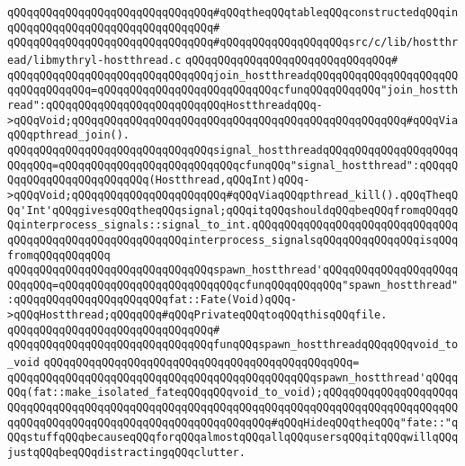 \verb|qQQqqQQqqQQqqQQqqQQqqQQqqQQqqQQq#qQQqtheqQQqtableqQQqconstructedqQQqin|\newline
\verb|qQQqqQQqqQQqqQQqqQQqqQQqqQQqqQQq#|\newline
\verb|qQQqqQQqqQQqqQQqqQQqqQQqqQQqqQQq#qQQqqQQqqQQqqQQqqQQqsrc/c/lib/hostthread/libmythryl-hostthread.c|\newline
\verb|qQQqqQQqqQQqqQQqqQQqqQQqqQQqqQQq#|\newline
\verb|qQQqqQQqqQQqqQQqqQQqqQQqqQQqqQQqjoin_hostthreadqQQqqQQqqQQqqQQqqQQqqQQqqQQqqQQqqQQq=qQQqqQQqqQQqqQQqqQQqqQQqqQQqcfunqQQqqQQqqQQq"join_hostthread":qQQqqQQqqQQqqQQqqQQqqQQqqQQqHostthreadqQQq->qQQqVoid;qQQqqQQqqQQqqQQqqQQqqQQqqQQqqQQqqQQqqQQqqQQqqQQqqQQq#qQQqViaqQQqpthread_join().|\newline
\verb|qQQqqQQqqQQqqQQqqQQqqQQqqQQqqQQqsignal_hostthreadqQQqqQQqqQQqqQQqqQQqqQQqqQQq=qQQqqQQqqQQqqQQqqQQqqQQqqQQqcfunqQQq"signal_hostthread":qQQqqQQqqQQqqQQqqQQqqQQqqQQq(Hostthread,qQQqInt)qQQq->qQQqVoid;qQQqqQQqqQQqqQQqqQQqqQQq#qQQqViaqQQqpthread_kill().qQQqTheqQQq'Int'qQQqgivesqQQqtheqQQqsignal;qQQqitqQQqshouldqQQqbeqQQqfromqQQqqQQqinterprocess_signals::signal_to_int.qQQqqQQqqQQqqQQqqQQqqQQqqQQqqQQqqQQqqQQqqQQqqQQqqQQqqQQqqQQqinterprocess_signalsqQQqqQQqqQQqqQQqisqQQqfromqQQqqQQqqQQq|\newline
\verb|qQQqqQQqqQQqqQQqqQQqqQQqqQQqqQQqspawn_hostthread'qQQqqQQqqQQqqQQqqQQqqQQqqQQq=qQQqqQQqqQQqqQQqqQQqqQQqqQQqcfunqQQqqQQqqQQq"spawn_hostthread":qQQqqQQqqQQqqQQqqQQqqQQqfat::Fate(Void)qQQq->qQQqHostthread;qQQqqQQq#qQQqPrivateqQQqtoqQQqthisqQQqfile.|\newline
\newline
\verb|qQQqqQQqqQQqqQQqqQQqqQQqqQQqqQQq#|\newline
\verb|qQQqqQQqqQQqqQQqqQQqqQQqqQQqqQQqfunqQQqspawn_hostthreadqQQqqQQqvoid_to_void|\newline
\verb|qQQqqQQqqQQqqQQqqQQqqQQqqQQqqQQqqQQqqQQqqQQqqQQq=|\newline
\verb|qQQqqQQqqQQqqQQqqQQqqQQqqQQqqQQqqQQqqQQqqQQqqQQqspawn_hostthread'qQQqqQQq(fat::make_isolated_fateqQQqqQQqvoid_to_void);qQQqqQQqqQQqqQQqqQQqqQQqqQQqqQQqqQQqqQQqqQQqqQQqqQQqqQQqqQQqqQQqqQQqqQQqqQQqqQQqqQQqqQQqqQQqqQQqqQQqqQQqqQQqqQQqqQQqqQQqqQQqqQQqqQQq#qQQqHideqQQqtheqQQq"fate::"qQQqstuffqQQqbecauseqQQqforqQQqalmostqQQqallqQQqusersqQQqitqQQqwillqQQqjustqQQqbeqQQqdistractingqQQqclutter.|\newline
\newline
